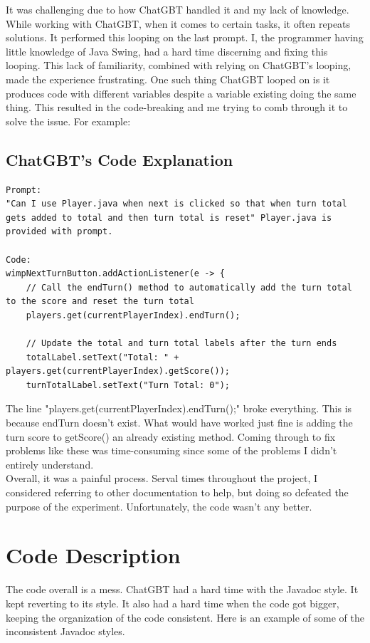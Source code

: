 \documentclass[a4paper,11pt]{article}
\begin{document}
It was challenging due to how ChatGBT handled it and my lack of knowledge. While working with ChatGBT, when it comes to certain tasks, it often repeats solutions. It performed this looping on the last prompt. I, the programmer having little knowledge of Java Swing, had a hard time discerning and fixing this looping. This lack of familiarity, combined with relying on ChatGBT’s looping, made the experience frustrating. One such thing ChatGBT looped on is it produces code with different variables despite a variable existing doing the same thing. This resulted in the code-breaking and me trying to comb through it to solve the issue. For example:
\subsection*{ChatGBT's Code Explanation}
\begin{verbatim}
Prompt:
"Can I use Player.java when next is clicked so that when turn total gets added to total and then turn total is reset" Player.java is provided with prompt.

Code:
wimpNextTurnButton.addActionListener(e -> {
    // Call the endTurn() method to automatically add the turn total to the score and reset the turn total
    players.get(currentPlayerIndex).endTurn();
    
    // Update the total and turn total labels after the turn ends
    totalLabel.setText("Total: " + players.get(currentPlayerIndex).getScore());
    turnTotalLabel.setText("Turn Total: 0");
\end{verbatim}
The line "players.get(currentPlayerIndex).endTurn();" broke everything. This is because endTurn doesn't exist. What would have worked just fine is adding the turn score to getScore() an already existing method. Coming through to fix problems like these was time-consuming since some of the problems I didn't entirely understand.\\
Overall, it was a painful process. Serval times throughout the project, I considered referring to other documentation to help, but doing so defeated the purpose of the experiment. Unfortunately, the code wasn't any better. 

\section*{Code Description}
The code overall is a mess. ChatGBT had a hard time with the Javadoc style. It kept reverting to its style. It also had a hard time 
when the code got bigger, keeping the organization of the code consistent. Here is an example of some of the inconsistent Javadoc styles. 
\end{document}
